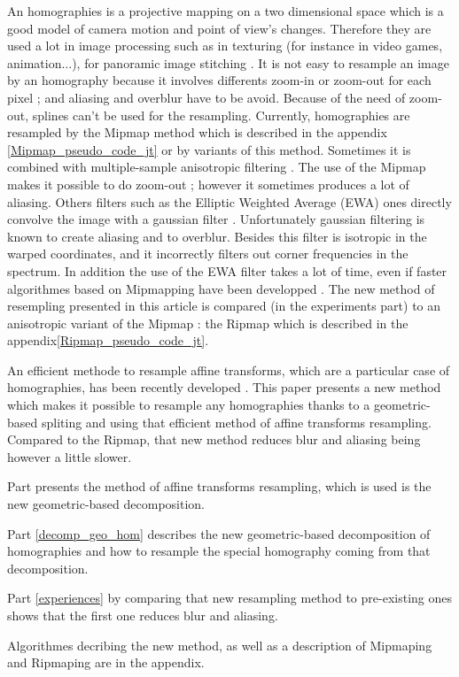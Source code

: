 
An homographies is a projective mapping on a two dimensional space which is a good model of camera motion and point of view's changes. Therefore they are used a lot in image processing such as in texturing \cite{heckbert1983texture} (for instance in video games, animation...), for panoramic image stitching \cite{brown2007automatic}. It is not easy to resample an image by an homography because it involves differents zoom-in or zoom-out for each pixel ; and aliasing and overblur have to be avoid. Because of the need of zoom-out, splines can't be used for the resampling. Currently, homographies are resampled by the Mipmap method \cite{williams1983pyramidal} which is described in the appendix \ref{Mipmap_pseudo_code_jt} or by variants of this method. Sometimes it is combined with multiple-sample anisotropic filtering  \cite{barkans1997high}. The use of the Mipmap makes it possible to do zoom-out ; however it sometimes produces a lot of aliasing. Others filters such as the Elliptic Weighted Average (EWA) ones directly convolve the image with a gaussian filter \cite{greene1986creating}. Unfortunately gaussian filtering is known to create aliasing and to overblur. Besides this filter is isotropic in the warped coordinates, and it incorrectly filters out corner frequencies in the spectrum. In addition the use of the EWA filter takes a lot of time, even if faster algorithmes based on Mipmapping have been developped \cite{mccormack1999feline,huttner1999fast}. The new method of resempling presented in this article is compared (in the experiments part) to an anisotropic variant of the Mipmap : the Ripmap \cite{akenine2008real} which is described in the appendix\ref{Ripmap_pseudo_code_jt}.

	An efficient methode to resample affine transforms, which are a particular case of homographies, has been recently developed \cite{szeliski2010high}. This paper presents a new method which makes it possible to resample any homographies thanks to a geometric-based spliting and using that efficient method of affine transforms resampling. Compared to the Ripmap, that new method reduces blur and aliasing being however a little slower. 
	
	Part \label{szeliski_section} presents the method of affine transforms resampling, which is used is the new geometric-based decomposition.
	
	Part \ref{decomp_geo_hom} describes the new geometric-based decomposition of homographies and how to resample the special homography coming from that decomposition.
	
	Part \ref{experiences} by comparing that new resampling method to pre-existing ones shows that the first one reduces blur and aliasing.
	
	Algorithmes decribing the new method, as well as a description of Mipmaping and Ripmaping are in the appendix.
	

